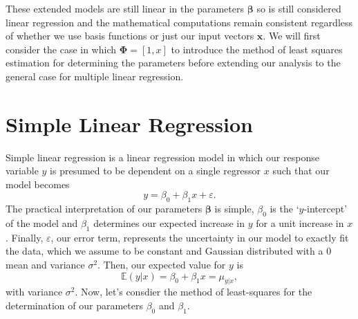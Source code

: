 \documentclass[10pt,a4paper]{article}
\numberwithin{equation}{section}
\theoremstyle{plain}
\theoremstyle{own}
\begin{document}
These extended models are still linear in the parameters $\boldsymbol\beta$ so is still considered linear regression and the mathematical computations remain consistent regardless of whether we use basis functions or just our input vectors $\mathbf{x}$. We will first consider the case in which $\boldsymbol\Phi = [1, x]$ to introduce the method of least squares estimation for determining the parameters before extending our analysis to the general case for multiple linear regression.
\section{Simple Linear Regression}
Simple linear regression is a linear regression model in which our response variable $y$ is presumed to be dependent on a single regressor $x$ such that our model becomes
\begin{equation}
y = \beta_0 + \beta_1 x + \varepsilon.
\end{equation}
The practical interpretation of our parameters $\boldsymbol\beta$ is simple, $\beta_0$ is the `$y$-intercept' of the model and $\beta_1$ determines our expected increase in $y$ for a unit increase in $x$. Finally, $\varepsilon$, our error term, represents the uncertainty in our model to exactly fit the data, which we assume to be constant and Gaussian distributed with a 0 mean and variance $\sigma^2$. Then, our expected value for $y$ is
\begin{equation}
\mathbb{E}(y|x) = \beta_0 + \beta_1 x = \mu_{y|x},
\end{equation}
with variance $\sigma^2$. Now, let's consdier the method of least-squares for the determination of our parameters $\beta_0$ and $\beta_1$.
\end{document}
